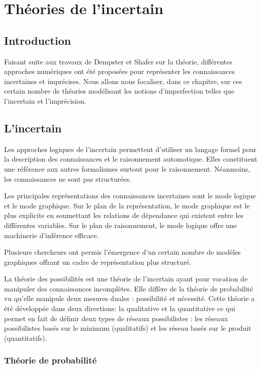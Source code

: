 \chapter{Théories de l'incertain}

{}
\section*{Introduction}
Faisant suite aux travaux de Dempster et Shafer sur la théorie, différentes approches numériques ont été
proposées pour représenter les connaissances incertaines et imprécises. Nous allons nous focaliser, dans ce chapitre, sur ces certain nombre de théories modélisant les notions d’imperfection telles que l’incertain et l’imprécision.

\section{L’incertain}

Les approches logiques de l’incertain permettent d’utiliser un langage formel pour la description des connaissances et le raisonnement automatique. Elles constituent une référence aux autres formalismes surtout pour le raisonnement. Néanmoins, les connaissances ne  sont pas structurées.

Les principales représentations des connaissances incertaines sont le mode logique et le mode graphique.\cite{hkhallafiThesis}
Sur le plan de la représentation, le mode graphique est le plus explicite en soumettant les relations de dépendance qui existent entre les différentes variables. Sur le plan de raisonnement, le mode logique offre une machinerie d’inférence efficace.

Plusieurs chercheurs ont permis l’émergence d’un certain nombre de modèles graphiques offrant un cadre de représentation plus structuré.

La théorie des possibilités est une théorie de l’incertain ayant pour vocation de manipuler des connaissances incomplètes. Elle diffère de la théorie de probabilité  vu qu'elle manipule deux mesures duales : possibilité et nécessité. Cette théorie a été développée dans deux directions: la qualitative et la quantitative ce qui permet en fait de définir deux types de réseaux  possibilistes : les réseaux possibilistes basés sur le minimum (qualitatifs) et les réseau basés sur le produit (quantitatifs).\cite{hkhallafiThesis}\cite{kZebouchi2Thesis}
\subsection{Théorie de probabilité}

